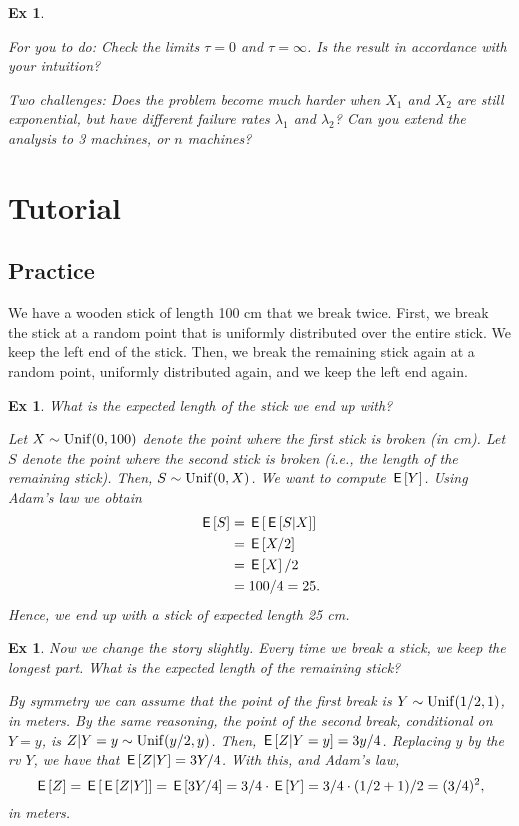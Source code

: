 \documentclass[a4paper,11pt]{article}
\newtheorem{exercise}[theorem]{Ex}
\begin{document}
\begin{exercise}
\begin{solution}
For you to do: Check the limits $\tau=0$ and $\tau=\infty$. Is the result in accordance with your intuition?

Two challenges: Does the problem become much harder when $X_{1}$ and $X_{2}$ are still exponential, but have different failure rates $\lambda_1$ and $\lambda_{2}$? Can you extend the analysis to 3 machines, or $n$ machines?

\end{solution}
\end{exercise}


\section{Tutorial}
\label{sec:tutorial}


\subsection{Practice}

We have a wooden stick of length 100 cm that we break twice.
First, we break the stick at a random point that is uniformly distributed over the entire stick.
We keep the left end of the stick.
Then, we break the remaining stick again at a random point, uniformly distributed again, and we keep the left end again.

\begin{exercise}
What is the expected length of the stick we end up with?
\begin{solution}
Let $X \sim \mathrm{Unif}(0,100)$ denote the point where the first stick is broken (in cm). Let $S$ denote the point where the second stick is broken (i.e., the length of the remaining stick). Then, $S \sim \mathrm{Unif}(0,X)$. We want to compute $\,\mathsf{E}\left[Y\right]$. Using Adam's law we obtain
\begin{align}
    \,\mathsf{E}\left[S\right] &= \,\mathsf{E}\left[\,\mathsf{E}\left[S|X\right]\right] \\
    &= \,\mathsf{E}\left[X/2\right] \\
    &= \,\mathsf{E}\left[X\right]/2 \\
    &= 100/4 = 25.
\end{align}
Hence, we end up with a stick of expected length 25 cm.
\end{solution}
\end{exercise}

\begin{exercise}
Now we change the story slightly. Every time we break a stick, we keep the \textit{longest} part. What is the expected length of the remaining stick?
\begin{solution}
By symmetry we can assume that the point of the first break is $Y\sim\mathrm{Unif}(1/2, 1)$, in meters. By the same reasoning, the point of the second break, conditional on $Y=y$, is $Z|Y=y \sim \mathrm{Unif}(y/2, y)$. Then, $\,\mathsf{E}\left[Z|Y=y\right] = 3y/4$. Replacing $y$ by the rv $Y$, we have that $\,\mathsf{E}\left[Z|Y\right] = 3 Y/4$. With this, and Adam's law,
\begin{equation}
\,\mathsf{E}\left[Z\right] = \,\mathsf{E}\left[\,\mathsf{E}\left[Z|Y\right]\right] = \,\mathsf{E}\left[3Y/4\right] = 3/4\cdot \,\mathsf{E}\left[Y\right]= 3/4\cdot (1/2+1)/2 = (3/4)^{2},
\end{equation}
in meters.

\end{solution}
\end{exercise}
\end{document}
